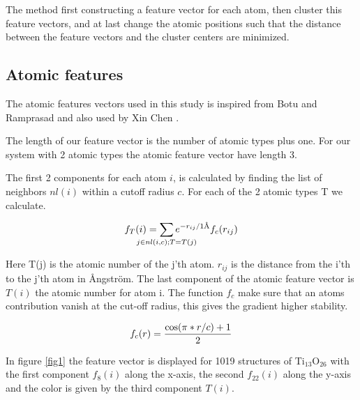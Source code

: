 \documentclass[%
 aps,
 prl,%
 amsmath,amssymb,
 reprint,%
]{revtex4-1}
\begin{document}
The method first constructing a feature vector for each atom, then cluster this feature vectors, and at last change the atomic positions such that the distance between the feature vectors and the cluster centers are minimized.   


\subsection{Atomic features}
 
The atomic features vectors used in this study is inspired from Botu and Ramprasad \cite{Boto2015} and also used by Xin Chen \cite{Chen2017}.

The length of our feature vector is the number of atomic types plus one. For our system with 2 atomic types the atomic feature vector have length 3.

The first 2 components for each atom $i$, is calculated by finding the list of neighbors $nl(i)$ within a cutoff radius $c$. For each of the 2 atomic types T we calculate. 

\begin{equation}
f_T(i) = \sum_{\mathclap{j \in nl(i,c);T=T(j)}} e^{-r_{ij}/1\text{\AA}}f_c(r_{ij})  \label{eq1}
\end{equation}

Here T(j) is the atomic number of the j'th atom. $r_{ij}$ is the distance from the i'th to the j'th atom in {\AA}ngstr\"{o}m. The last component of the atomic feature vector is $T(i)$ the atomic number for atom i. 
The function $f_c$ make sure that an atoms contribution vanish at the cut-off radius, this gives the gradient higher stability.

\begin{equation}
f_c(r)={{\cos(\pi*r/c)+1}\over 2}
\end{equation}



In figure \ref{fig1} the feature vector is displayed for 1019 structures of Ti$_{13}$O$_{26}$ with the first component $f_8(i)$ along the x-axis, the second $f_{22}(i)$ along the y-axis and the color is given by the third component $T(i)$. 
\end{document}
